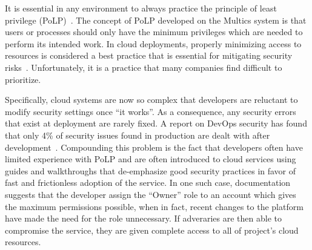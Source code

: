 It is essential in any environment to always practice the principle of least privilege (PoLP)~\cite{Saltzer1974}. The concept of PoLP developed on the Multics system is that users or processes should only have the minimum privileges which are needed to perform its intended 
work.  In cloud deployments, properly minimizing access to resources is considered
a best practice that is essential for mitigating security risks~\cite{Sanders2018}. 
Unfortunately, it is a practice that many companies find difficult to prioritize.


Specifically, cloud systems are now so complex that developers are reluctant to modify security
settings once ``it works''. As a consequence, any security errors that exist at deployment are
rarely fixed.  A report on DevOps security has found that only 4\% of security issues found in 
production are dealt with after development~\cite{Foremski}. Compounding this problem is the
fact that developers often have limited experience with PoLP and are often introduced to cloud 
services using guides and walkthroughs that de-emphasize good security practices in favor of 
fast and  frictionless adoption of the service.  In one such case, documentation suggests that 
the developer assign the ``Owner'' role to an account which gives the maximum permissions
possible, when in fact, recent changes to the platform have made the need for the role
unnecessary\cite{GoogleVis}.  If adveraries are then able to compromise the service,
they are given complete access to all of project's cloud resources.



